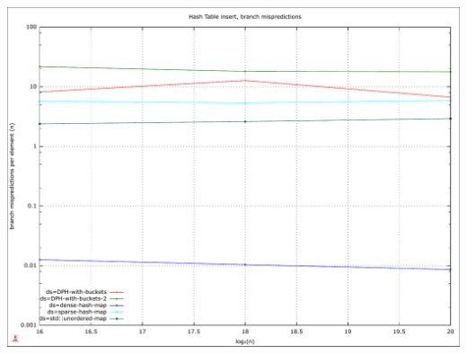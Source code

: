 \documentclass{article}
\begin{document}
\includegraphics[width=\linewidth]{img/hash_insert_branchmiss}
\raggedright
\end{document}
